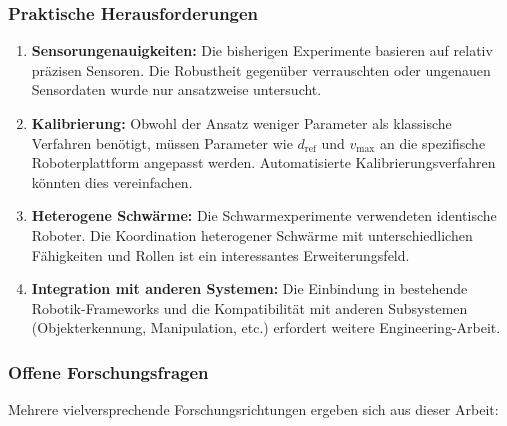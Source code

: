 ﻿\documentclass[a4paper,12pt]{article}
\theoremstyle{definition}
\begin{document}
\subsubsection{Praktische Herausforderungen}

\begin{enumerate}
	\item \textbf{Sensorungenauigkeiten:} Die bisherigen Experimente basieren auf relativ präzisen Sensoren. Die Robustheit gegenüber verrauschten oder ungenauen Sensordaten wurde nur ansatzweise untersucht.
	
	\item \textbf{Kalibrierung:} Obwohl der Ansatz weniger Parameter als klassische Verfahren benötigt, müssen Parameter wie $d_{\text{ref}}$ und $v_{\text{max}}$ an die spezifische Roboterplattform angepasst werden. Automatisierte Kalibrierungsverfahren könnten dies vereinfachen.
	
	\item \textbf{Heterogene Schwärme:} Die Schwarmexperimente verwendeten identische Roboter. Die Koordination heterogener Schwärme mit unterschiedlichen Fähigkeiten und Rollen ist ein interessantes Erweiterungsfeld.
	
	\item \textbf{Integration mit anderen Systemen:} Die Einbindung in bestehende Robotik-Frameworks und die Kompatibilität mit anderen Subsystemen (Objekterkennung, Manipulation, etc.) erfordert weitere Engineering-Arbeit.
\end{enumerate}

\subsubsection{Offene Forschungsfragen}

Mehrere vielversprechende Forschungsrichtungen ergeben sich aus dieser Arbeit:
\end{document}
